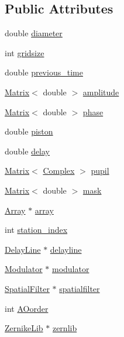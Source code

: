 \subsection*{Public Attributes}
\begin{DoxyCompactItemize}
\item 
double \hyperlink{classBeam_a5b8823412936aee5a88bc657e0ed546c}{diameter}
\item 
int \hyperlink{classBeam_a1c813015bb33a0565e1ee3ea0d570e11}{gridsize}
\item 
double \hyperlink{classBeam_ac1e58da3860afeb2d8d6e1daf7022cca}{previous\_\-time}
\item 
\hyperlink{classMatrix}{Matrix}$<$ double $>$ \hyperlink{classBeam_ac83b6ebc1b9d745461ba630555636109}{amplitude}
\item 
\hyperlink{classMatrix}{Matrix}$<$ double $>$ \hyperlink{classBeam_aa2ed8956a6aca9da62da12bcb8cebb7b}{phase}
\item 
double \hyperlink{classBeam_a342991126e87a3a2aa89d04ff7b2fd0a}{piston}
\item 
double \hyperlink{classBeam_affa1c91c24f15b6acbaae1682b19d9a7}{delay}
\item 
\hyperlink{classMatrix}{Matrix}$<$ \hyperlink{Matrix_8h_a37333e1628babc1863d6963489e5e9ea}{Complex} $>$ \hyperlink{classBeam_a3b248c45a5630e6e0761b1f2d16350fc}{pupil}
\item 
\hyperlink{classMatrix}{Matrix}$<$ double $>$ \hyperlink{classBeam_af1dc67711c28c260a813088d4afb14e9}{mask}
\item 
\hyperlink{classArray}{Array} $\ast$ \hyperlink{classBeam_abb5a7f1e41ea63a0e693f6e29e11e16c}{array}
\item 
int \hyperlink{classBeam_ae589b08d6d0d638c18a15880efc521d2}{station\_\-index}
\item 
\hyperlink{classDelayLine}{DelayLine} $\ast$ \hyperlink{classBeam_abb779dd249b5a26502a49106aa8023a4}{delayline}
\item 
\hyperlink{classModulator}{Modulator} $\ast$ \hyperlink{classBeam_a1ef612af4b85d2e5866d40eec618efcb}{modulator}
\item 
\hyperlink{classSpatialFilter}{SpatialFilter} $\ast$ \hyperlink{classBeam_a68bc1a7abd201297114cd53af925f83f}{spatialfilter}
\item 
int \hyperlink{classBeam_a2de78a8bf91493e5c0cf0544613d0289}{AOorder}
\item 
\hyperlink{classZernikeLib}{ZernikeLib} $\ast$ \hyperlink{classBeam_ad41f9e0d00cfe3ed0e5a22a2f3e7c399}{zernlib}
\end{DoxyCompactItemize}


